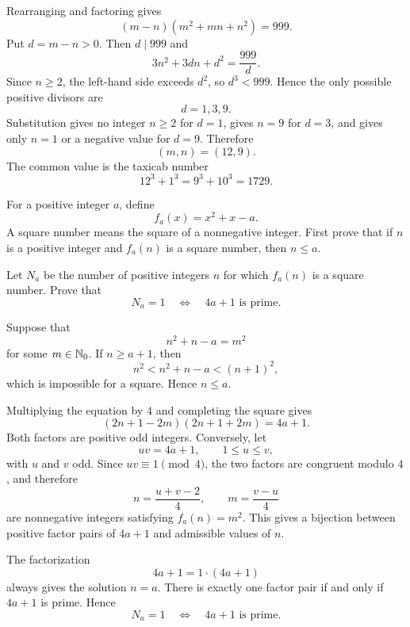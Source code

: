     \begin{solution}
        Rearranging and factoring gives
        \[
            (m-n)(m^2+mn+n^2)=999.
        \]
        Put $d=m-n>0$. Then $d\mid999$ and
        \[
            3n^2+3dn+d^2=\frac{999}{d}.
        \]
        Since $n\geq2$, the left-hand side exceeds $d^2$, so $d^3<999$.
        Hence the only possible positive divisors are
        \[
            d=1,3,9.
        \]
        Substitution gives no integer $n\geq2$ for $d=1$, gives $n=9$ for
        $d=3$, and gives only $n=1$ or a negative value for $d=9$. Therefore
        \[
            \boxed{(m,n)=(12,9)}.
        \]
        The common value is the taxicab number
        \[
            12^3+1^3=9^3+10^3=1729.
        \]
    \end{solution}

    \begin{expectedproblem}
        For a positive integer $a$, define
        \[
            f_a(x)=x^2+x-a.
        \]
        A square number means the square of a nonnegative integer. First prove
        that if $n$ is a positive integer and $f_a(n)$ is a square number, then
        $n\leq a$.

        Let $N_a$ be the number of positive integers $n$ for which $f_a(n)$ is
        a square number. Prove that
        \[
            N_a=1
            \quad\Longleftrightarrow\quad
            4a+1\text{ is prime}.
        \]
    \end{expectedproblem}

    \begin{solution}
        Suppose that
        \[
            n^2+n-a=m^2
        \]
        for some $m\in\mathbb{N}_0$. If $n\geq a+1$, then
        \[
            n^2<n^2+n-a<(n+1)^2,
        \]
        which is impossible for a square. Hence $n\leq a$.

        Multiplying the equation by $4$ and completing the square gives
        \[
            (2n+1-2m)(2n+1+2m)=4a+1.
        \]
        Both factors are positive odd integers. Conversely, let
        \[
            uv=4a+1,
            \qquad
            1\leq u\leq v,
        \]
        with $u$ and $v$ odd. Since $uv\equiv1\pmod4$, the two factors are
        congruent modulo $4$, and therefore
        \[
            n=\frac{u+v-2}{4},
            \qquad
            m=\frac{v-u}{4}
        \]
        are nonnegative integers satisfying $f_a(n)=m^2$. This gives a
        bijection between positive factor pairs of $4a+1$ and admissible values
        of $n$.

        The factorization
        \[
            4a+1=1\cdot(4a+1)
        \]
        always gives the solution $n=a$. There is exactly one factor pair if
        and only if $4a+1$ is prime. Hence
        \[
            \boxed{
                N_a=1
                \quad\Longleftrightarrow\quad
                4a+1\text{ is prime}
            }.
        \]
    \end{solution}

